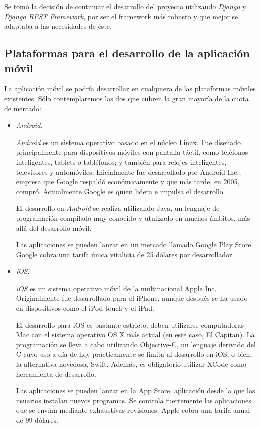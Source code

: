 Se tomó la decisión de continuar el desarrollo del proyecto utilizando
\textit{Django} y \textit{Django REST Framework}, por ser el framework más
robusto y que mejor se adaptaba a las necesidades de éste.


\subsection{Plataformas para el desarrollo de la aplicación móvil}

La aplicación móvil se podría desarrollar en cualquiera de las plataformas
móviles existentes. Sólo contemplaremos las dos que cubren la gran mayoría de
la cuota de mercado:

\begin{itemize}
\item \textit{Android}.~\cite{android}

\textit{Android} es un sistema operativo basado en el núcleo Linux. Fue diseñado
principalmente para dispositivos móviles con pantalla táctil, como teléfonos
inteligentes, tablets o tabléfonos; y también para relojes inteligentes,
televisores y automóviles. Inicialmente fue desarrollado por Android Inc.,
empresa que Google respaldó económicamente y que más tarde, en 2005, compró.
Actualmente Google es quien lidera e impulsa el desarrollo.

El desarrollo en \textit{Android} se realiza utilizando Java, un lenguaje de
programación compilado muy conocido y utulizado en muchos ámbitos, más allá del
desarrollo móvil.

Las aplicaciones se pueden lanzar en un mercado llamado Google Play Store.
Google cobra una tarifa única vitalicia de 25 dólares por desarrollador.

\item \textit{iOS}.~\cite{ios}

\textit{iOS} es un sistema operativo móvil de la multinacional Apple Inc.
Originalmente fue desarrollado para el iPhone, aunque después se ha usado en
dispositivos como el iPod touch y el iPad.

El desarrollo para iOS es bastante estricto: deben utilizarse computadoras Mac
con el sistema operativo OS X más actual (en este caso, El Capitan). La
programación se lleva a cabo utilizando Objective-C, un lenguaje derivado del C
cuyo uso a día de hoy prácticamente se limita al desarrollo en iOS, o bien, la
alternativa novedosa, Swift. Además, es obligatorio  utilizar XCode como
herramienta de desarrollo.

Las aplicaciones se pueden lanzar en la App Store, aplicación desde la que los
usuarios instalan nuevos programas. Se controla fuertemente las aplicaciones que
se envían mediante exhaustivas revisiones. Apple cobra una tarifa anual de 99
dólares.

\end{itemize}

